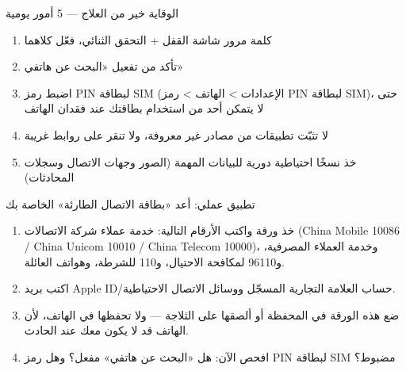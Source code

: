 \begin{tcbwarn}{الوقاية خير من العلاج — 5 أمور يومية}
\begin{enumerate}
  \item كلمة مرور شاشة القفل + التحقق الثنائي، فعّل كلاهما
  \item تأكد من تفعيل «البحث عن هاتفي»
  \item اضبط رمز PIN لبطاقة SIM (الإعدادات > الهاتف > رمز PIN لبطاقة SIM)، حتى لا يتمكن أحد من استخدام بطاقتك عند فقدان الهاتف
  \item لا تثبّت تطبيقات من مصادر غير معروفة، ولا تنقر على روابط غريبة
  \item خذ نسخًا احتياطية دورية للبيانات المهمة (الصور وجهات الاتصال وسجلات المحادثات)
\end{enumerate}

\end{tcbwarn}

\begin{tcbpractice}{تطبيق عملي: أعد «بطاقة الاتصال الطارئة» الخاصة بك}
\begin{enumerate}
  \item خذ ورقة واكتب الأرقام التالية: خدمة عملاء شركة الاتصالات (China Mobile 10086 / China Unicom 10010 / China Telecom 10000)، وخدمة العملاء المصرفية، و96110 لمكافحة الاحتيال، و110 للشرطة، وهواتف العائلة.
  \item اكتب بريد Apple ID/حساب العلامة التجارية المسجّل ووسائل الاتصال الاحتياطية.
  \item ضع هذه الورقة في المحفظة أو ألصقها على الثلاجة — ولا تحفظها في الهاتف، لأن الهاتف قد لا يكون معك عند الحادث.
  \item افحص الآن: هل «البحث عن هاتفي» مفعل؟ وهل رمز PIN لبطاقة SIM مضبوط؟
\end{enumerate}

\end{tcbpractice}

